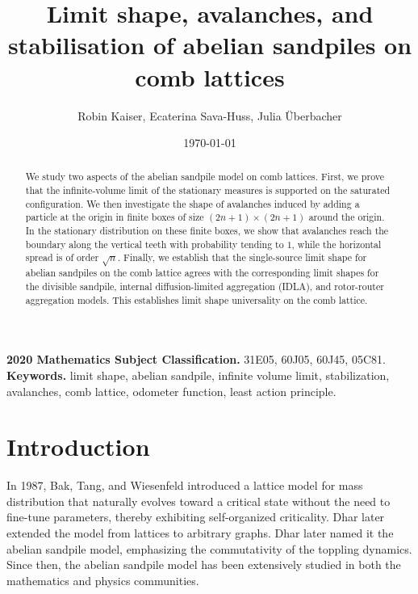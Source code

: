 \documentclass[11pt]{article}
\title{Limit shape, avalanches, and stabilisation of abelian sandpiles on comb lattices}
\author{Robin Kaiser, Ecaterina Sava-Huss, Julia Überbacher}
\date{\today}
\begin{document}
\maketitle

\begin{abstract}
We study two aspects of the abelian sandpile model on comb lattices. First, we prove that the infinite-volume limit of the stationary measures is supported on the saturated configuration. We then investigate the shape of avalanches induced by adding a particle at the origin in finite boxes of size $(2n+1)\times(2n+1)$ around the origin. In the stationary distribution on these finite boxes, we show that avalanches reach the boundary along the vertical teeth with probability tending to $1$, while the horizontal spread is of order $\sqrt{n}$. Finally, we establish that the single-source limit shape for abelian sandpiles on the comb lattice agrees with the corresponding limit shapes for the divisible sandpile, internal diffusion-limited aggregation (IDLA), and rotor-router aggregation models. This establishes limit shape universality on the comb lattice.
\end{abstract}

\textbf{2020 Mathematics Subject Classification.} 31E05, 60J05, 60J45, 05C81.\\
\textbf{Keywords.} limit shape, abelian sandpile, infinite volume limit, stabilization, avalanches, comb lattice, odometer function, least action principle.

\section{Introduction}

In 1987, Bak, Tang, and Wiesenfeld \cite{BTW87,BTW88} introduced a lattice model for mass distribution that naturally evolves toward a critical state without the need to fine-tune parameters, thereby exhibiting self-organized criticality. Dhar \cite{D90} later extended the model from lattices to arbitrary graphs. Dhar later named it the abelian sandpile model, emphasizing the commutativity of the toppling dynamics. Since then, the abelian sandpile model has been extensively studied in both the mathematics and physics communities.
\end{document}
